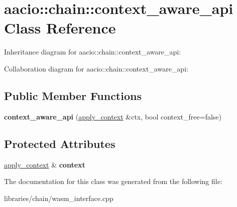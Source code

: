 \hypertarget{classaacio_1_1chain_1_1context__aware__api}{}\section{aacio\+:\+:chain\+:\+:context\+\_\+aware\+\_\+api Class Reference}
\label{classaacio_1_1chain_1_1context__aware__api}


Inheritance diagram for aacio\+:\+:chain\+:\+:context\+\_\+aware\+\_\+api\+:


Collaboration diagram for aacio\+:\+:chain\+:\+:context\+\_\+aware\+\_\+api\+:
\subsection*{Public Member Functions}
\begin{DoxyCompactItemize}
\item 
\mbox{\label{classaacio_1_1chain_1_1context__aware__api_ad2711b0a72fe3f1b0b1512c97e16d285}} 
{\bfseries context\+\_\+aware\+\_\+api} (\mbox{\hyperlink{classaacio_1_1chain_1_1apply__context}{apply\+\_\+context}} \&ctx, bool context\+\_\+free=false)
\end{DoxyCompactItemize}
\subsection*{Protected Attributes}
\begin{DoxyCompactItemize}
\item 
\mbox{\label{classaacio_1_1chain_1_1context__aware__api_ac183af9a261bd559936bf6778a6cd9e9}} 
\mbox{\hyperlink{classaacio_1_1chain_1_1apply__context}{apply\+\_\+context}} \& {\bfseries context}
\end{DoxyCompactItemize}


The documentation for this class was generated from the following file\+:\begin{DoxyCompactItemize}
\item 
libraries/chain/wasm\+\_\+interface.\+cpp\end{DoxyCompactItemize}
